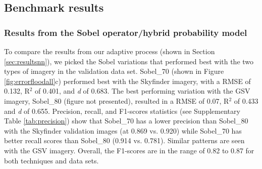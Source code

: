 \documentclass[final,3p,times,authoryear]{elsarticle}
\begin{document}
\subsection{Benchmark results}
\subsubsection{Results from the \cite{Wang2015a} Sobel operator/hybrid probability model}\label{sec:sobelwangbenchmark}
To compare the results from our adaptive process (shown in Section \ref{sec:resultsnn}), we picked the Sobel variations that performed best with the two types of imagery in the validation data set. Sobel\_70 (shown in Figure \ref{fig:errorfloodall}c) performed best with the Skyfinder imagery, with a RMSE of 0.132, R$^{2}$ of 0.401, and \textit{d} of 0.683. The best performing variation with the GSV imagery, Sobel\_80 (figure not presented), resulted in a RMSE of 0.07, R$^{2}$ of 0.433 and \textit{d} of 0.655. Precision, recall, and F1-scores statistics (see Supplementary Table \ref{tab:precision}) show that Sobel\_70 has a lower precision than Sobel\_80 with the Skyfinder validation images (at 0.869 vs. 0.920) while Sobel\_70 has better recall scores than Sobel\_80 (0.914 vs. 0.781). Similar patterns are seen with the GSV imagery. Overall, the F1-scores are in the range of 0.82 to 0.87 for both techniques and data sets.


\end{document}
